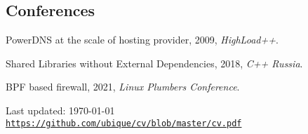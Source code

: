 \documentclass[letterpaper]{article}
\def\footerlink{https://github.com/ubique/cv/blob/master/cv.pdf}
\renewenvironment{itemize}{
  \begin{list}{}{
    \setlength{\leftmargin}{1.5em}
  }
}{
  \end{list}
}
\begin{document}
\subsection*{Conferences}

\begin{itemize}
\item PowerDNS at the scale of hosting provider, 2009, {\it HighLoad++}.
\item Shared Libraries without External Dependencies, 2018, {\it C++ Russia}.
\item BPF based firewall, 2021, {\it Linux Plumbers Conference}.
\end{itemize}

\bigskip

\begin{center}
  \begin{footnotesize}
    Last updated: \today \\
    \href{\footerlink}{\texttt{\footerlink}}
  \end{footnotesize}
\end{center}
\end{document}
